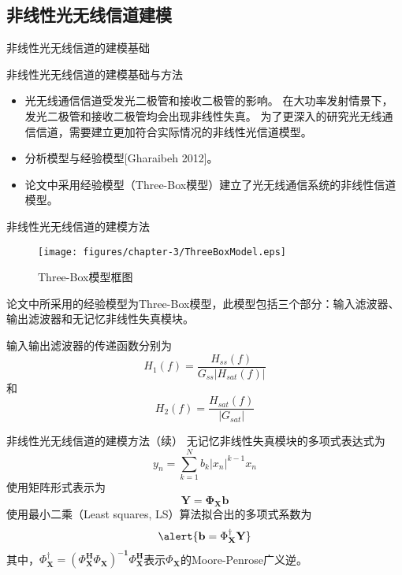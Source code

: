 \documentclass[mathserif, utf8, 9pt]{beamer}
\begin{document}
\subsection{非线性光无线信道建模}
\begin{frame}{非线性光无线信道的建模基础}
\begin{block}{非线性光无线信道的建模基础与方法}
\begin{itemize}
\item   光无线通信信道受发光二极管和接收二极管的影响。
        \alert{在大功率发射情景下，发光二极管和接收二极管均会出现非线性失真。
        为了更深入的研究光无线通信信道，需要建立更加符合实际情况的非线性光信道模型。}
\item   分析模型与\alert{经验模型}[Gharaibeh 2012]。
\item   论文中采用\alert{经验模型（Three-Box模型）}建立了光无线通信系统的非线性信道模型。
\end{itemize}
\end{block}
\end{frame}

\begin{frame}{非线性光无线信道的建模方法}
    \begin{figure}[htbp]
        \centering
    	\texttt{[image: figures/chapter-3/ThreeBoxModel.eps]}
    	\caption{Three-Box模型框图}
    \end{figure}
    论文中所采用的经验模型为Three-Box模型，此模型包括三个部分：输入滤波器、输出滤波器和无记忆非线性失真模块。
    
    \pause
    输入输出滤波器的传递函数分别为
    \begin{equation}
        H_1(f) = \frac{H_{ss}(f)}{G_{ss}\vert H_{sat}(f)\vert}
    \end{equation}
    和
    \begin{equation}
        H_2(f) = \frac{H_{sat}(f)}{\vert G_{sat}\vert}
    \end{equation}
\end{frame}

\begin{frame}{非线性光无线信道的建模方法（续）}
    无记忆非线性失真模块的多项式表达式为
    \begin{equation}
    	y_n = \sum_{k=1}^N b_k\vert x_n\vert^{k-1}x_n
    \end{equation}
    使用矩阵形式表示为
    \begin{equation}
    	\mathbf{Y} = \boldsymbol{\Phi}_\mathbf{X} \mathbf{b}
    \end{equation}
    使用最小二乘（Least squares, LS）算法拟合出的多项式系数为
    \begin{equation}
    	\alert{\mathbf{b} = \Phi_\mathbf{X}^\dag \mathbf{Y}}
    \end{equation}
    其中，$\Phi_\mathbf{X}^\dag = (\Phi_\mathbf{X}^\mathbf{H}\Phi_\mathbf{X})^\mathbf{-1}\Phi_\mathbf{X}^\mathbf{H}$表示$\Phi_\mathbf{X}$的Moore-Penrose广义逆。
\end{frame}
\end{document}
